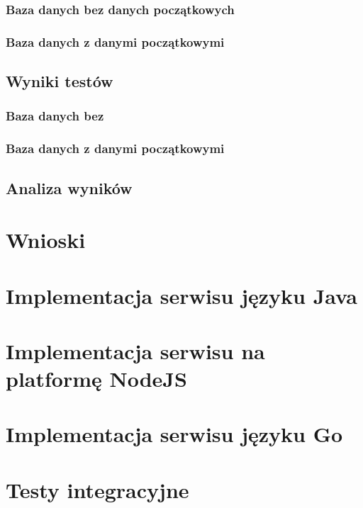 \documentclass[a4paper,12pt,twoside,openany]{report}
\begin{document}
\subsection{Baza danych bez danych początkowych}
\subsection{Baza danych z danymi początkowymi}

\section{Wyniki testów}
\subsection{Baza danych bez}
\subsection{Baza danych z danymi początkowymi}
\section{Analiza wyników}

\chapter{Wnioski}

\appendix
\chapter{Implementacja serwisu języku Java}
\chapter{Implementacja serwisu na platformę NodeJS}
\chapter{Implementacja serwisu języku Go}
\chapter{Testy integracyjne}

\begin{thebibliography}{99}

\end{thebibliography}

\zakonczenie  %
\end{document}
